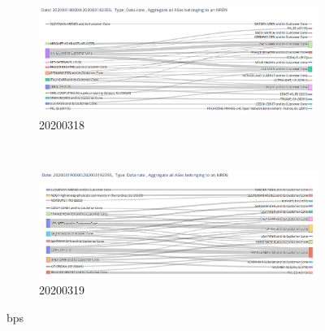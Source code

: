 \documentclass[10pt, journal, letterpaper]{IEEEtran}
\newcommand\boxFigSze{1}
\begin{document}
\begin{figure}
    \begin{subfigure}{\boxFigSze\textwidth}
          \centering
          \includegraphics[width=\columnwidth]{img/sankey_20200318_NRENlevel_bps.png}
          \caption{20200318}
          \label{fig:top_generating_fps}
    \end{subfigure}\\
    \begin{subfigure}{\boxFigSze\textwidth}
          \centering
          \includegraphics[width=\columnwidth]{img/sankey_20200319_NRENlevel_bps.png}
          \caption{20200319}
          \label{fig:top_receiving_bps}
    \end{subfigure}
    \caption{bps}
    \label{fig:sankey_bps}
\end{figure}
\end{document}
